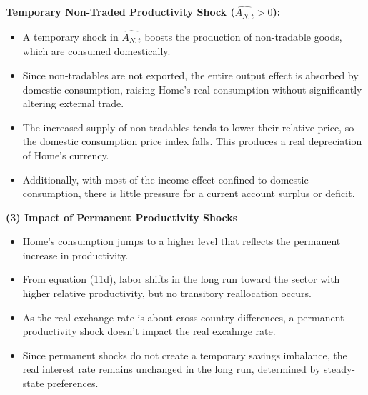 \documentclass[a4paper,12pt]{article} %
\theoremstyle{nonitalic}
\begin{document}
\textbf{Temporary Non-Traded Productivity Shock (\( \widehat{A_{N,t}} > 0 \)):}
\begin{itemize}
    \item A temporary shock in \( \widehat{A_{N,t}} \) boosts the production of non-tradable goods, which are consumed domestically.
    \item Since non-tradables are not exported, the entire output effect is absorbed by domestic consumption, raising Home's real consumption without significantly altering external trade.
    \item The increased supply of non-tradables tends to lower their relative price, so the domestic consumption price index falls. This produces a real depreciation of Home's currency.
    \item Additionally, with most of the income effect confined to domestic consumption, there is little pressure for a current account surplus or deficit.
\end{itemize}

\textbf{(3) Impact of Permanent Productivity Shocks}
\begin{itemize}
    \item Home's consumption jumps to a higher level that reflects the permanent increase in productivity.
    \item From equation (11d), labor shifts in the long run toward the sector with higher relative productivity, but no transitory reallocation occurs.
    \item As the real exchange rate is about cross-country differences, a permanent productivity shock doesn’t impact the real excahnge rate.
    \item Since permanent shocks do not create a temporary savings imbalance, the real interest rate remains unchanged in the long run, determined by steady-state preferences.
\end{itemize}
\end{document}

